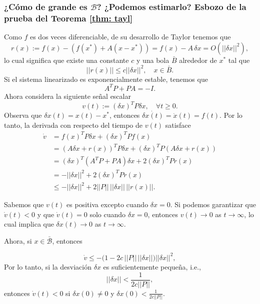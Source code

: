 \subsubsection{¿Cómo de grande es $\mathcal{B}$? ¿Podemos estimarlo? Esbozo de la prueba del Teorema \ref{thm: tayl}}

Como $f$ es dos veces diferenciable, de su desarrollo de Taylor tenemos que
\begin{equation}
	r(x) := f(x) - (f(x^*) + A(x - x^*)) = f(x) - A\,\delta x = O(||\delta x||^2),
\end{equation}
lo cual significa que existe una constante $c$ y una bola $\bar B$ alrededor de $x^*$ tal que 
\begin{equation}
	||r(x)|| \leq c||\delta x||^2, \quad x\in\bar B.
\end{equation}
Si el sistema linearizado es exponencialmente estable, tenemos que
\begin{equation}
A^TP + PA = -I.
\end{equation}
Ahora considera la siguiente señal escalar
\begin{equation}
	v(t) := (\delta x)^T P \delta x, \quad \forall t\geq 0.
\end{equation}
Observa que $\delta x(t) = x(t) - x^*$, entonces $\dot{\delta x(t)} = \dot x(t) = f(t)$. Por lo tanto, la derivada con respecto del tiempo de $v(t)$ satisface
\begin{align}
	\dot v &= f(x)^T P \delta x + (\delta x)^T P f(x) \nonumber \\
	&= (A\delta x + r(x))^T P \delta x + (\delta x)^T P (A\delta x + r(x)) \nonumber \\
	&= (\delta x)^T(A^T P + PA)\delta x + 2(\delta x)^T P r(x) \nonumber \\
	&= -||\delta x||^2 + 2(\delta x)^T P r(x) \nonumber \\
	&\leq -||\delta x||^2 + 2 ||P||\, ||\delta x|| \, ||r(x)||.
\end{align}

Sabemos que $v(t)$ es positiva excepto cuando $\delta x = 0$. Si podemos garantizar que $\dot v(t) < 0$ y que $\dot v(t) = 0$ solo cuando  $\delta x = 0$, entonces $v(t) \to 0$ as $t\to\infty$, lo cual implica que  $\delta x(t) \to 0$ as $t\to\infty$.

Ahora, si $x\in\mathcal{\bar B}$, entonces

\begin{equation}
	\dot v \leq -\Big(1 - 2c\,||P||\,||\delta x||\Big)||\delta x||^2,
\end{equation}
Por lo tanto, si la desviación  $\delta x$ es suficientemente pequeña, i.e., 
\begin{equation}
||\delta x|| < \frac{1}{2c||P||},
\end{equation}
entonces  $\dot v(t) < 0$ si $\delta x(0) \neq 0$ y $\delta x(0) < \frac{1}{2c||P||}$.

